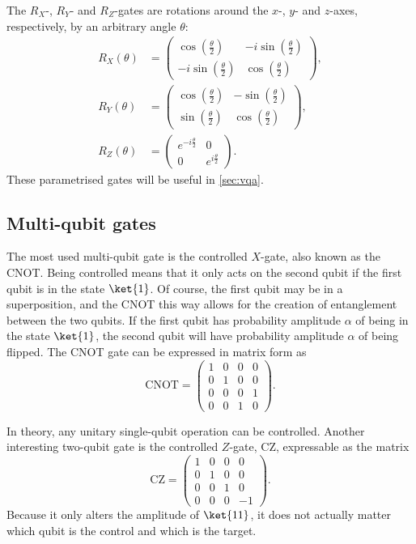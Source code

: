 The $R_X$-, $R_Y$- and $R_Z$-gates are rotations around the $x$-, $y$- and $z$-axes, respectively, by an arbitrary angle $\theta$:
\begin{align*}
    R_X(\theta) & = \begin{pmatrix} \cos\left(\frac{\theta}{2}\right) & -i \sin\left(\frac{\theta}{2}\right) \\ -i \sin\left(\frac{\theta}{2}\right) & \cos\left(\frac{\theta}{2}\right) \end{pmatrix}, \\
    R_Y(\theta) & = \begin{pmatrix} \cos\left(\frac{\theta}{2}\right) & -\sin\left(\frac{\theta}{2}\right) \\ \sin\left(\frac{\theta}{2}\right) & \cos\left(\frac{\theta}{2}\right) \end{pmatrix},      \\
    R_Z(\theta) & = \begin{pmatrix} e^{-i\frac{\theta}{2}} & 0 \\ 0 & e^{i\frac{\theta}{2}} \end{pmatrix}.
\end{align*}
These parametrised gates will be useful in \cref{sec:vqa}.

\subsection{Multi-qubit gates}
The most used multi-qubit gate is the controlled $X$-gate, also known as the CNOT.
Being controlled means that it only acts on the second qubit if the first qubit is in the state $\ket{1}$.
Of course, the first qubit may be in a superposition, and the CNOT this way allows for the creation of entanglement between the two qubits.
If the first qubit has probability amplitude $\alpha$ of being in the state $\ket{1}$, the second qubit will have probability amplitude $\alpha$ of being flipped.
The CNOT gate can be expressed in matrix form as
\begin{equation}
    \text{CNOT} = \begin{pmatrix} 1 & 0 & 0 & 0 \\ 0 & 1 & 0 & 0 \\ 0 & 0 & 0 & 1 \\ 0 & 0 & 1 & 0 \end{pmatrix}.
\end{equation}

In theory, any unitary single-qubit operation can be controlled.
Another interesting two-qubit gate is the controlled $Z$-gate, CZ, expressable as the matrix
\begin{equation}
    \text{CZ} = \begin{pmatrix} 1 & 0 & 0 & 0 \\ 0 & 1 & 0 & 0 \\ 0 & 0 & 1 & 0 \\ 0 & 0 & 0 & -1 \end{pmatrix}.
\end{equation}
Because it only alters the amplitude of $\ket{11}$, it does not actually matter which qubit is the control and which is the target.



